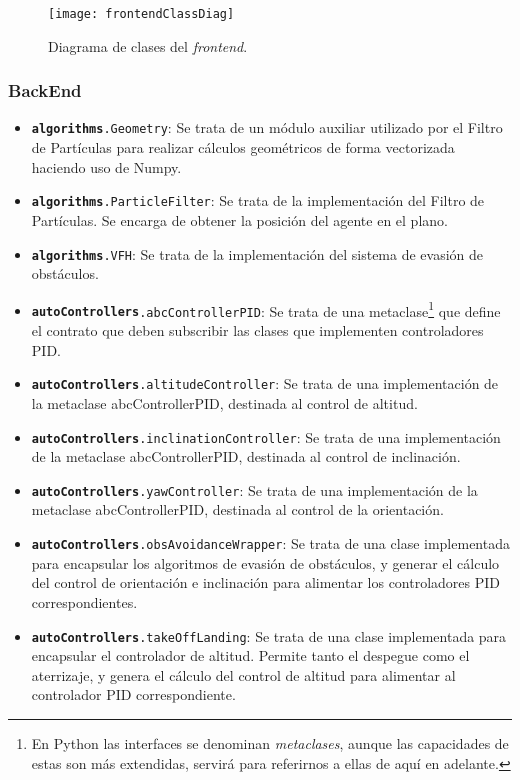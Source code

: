 \begin{figure}
	\centering
	\texttt{[image: frontendClassDiag]}
	\caption[Diagrama de clases FrontEnd]{Diagrama de clases del \emph{frontend}.}\label{fig:frontendClassDiag}
\end{figure}



\subsubsection{BackEnd}

\begin{itemize}
\item \texttt{\textbf{algorithms}.Geometry}: Se trata de un módulo auxiliar utilizado por el Filtro de Partículas para realizar cálculos geométricos de forma vectorizada haciendo uso de Numpy.
\item \texttt{\textbf{algorithms}.ParticleFilter}: Se trata de la implementación del Filtro de Partículas. Se encarga de obtener la posición del agente en el plano.
\item \texttt{\textbf{algorithms}.VFH}: Se trata de la implementación del sistema de evasión de obstáculos. 
\item \texttt{\textbf{autoControllers}.abcControllerPID}: Se trata de una metaclase\footnote{En Python las interfaces se denominan \emph{metaclases}, aunque las capacidades de estas son más extendidas, servirá para referirnos a ellas de aquí en adelante.} que define el contrato que deben subscribir las clases que implementen controladores PID.
\item \texttt{\textbf{autoControllers}.altitudeController}: Se trata de una implementación de la metaclase abcControllerPID, destinada al control de altitud.
\item \texttt{\textbf{autoControllers}.inclinationController}: Se trata de una implementación de la metaclase abcControllerPID, destinada al control de inclinación.
\item \texttt{\textbf{autoControllers}.yawController}: Se trata de una implementación de la metaclase abcControllerPID, destinada al control de la orientación.
\item \texttt{\textbf{autoControllers}.obsAvoidanceWrapper}: Se trata de una clase implementada para encapsular los algoritmos de evasión de obstáculos, y generar el cálculo del control de orientación e inclinación para alimentar los controladores PID correspondientes.
\item \texttt{\textbf{autoControllers}.takeOffLanding}: Se trata de una clase implementada para encapsular el controlador de altitud. Permite tanto el despegue como el aterrizaje, y genera el cálculo del control de altitud para alimentar al controlador PID correspondiente. 

\end{itemize}
